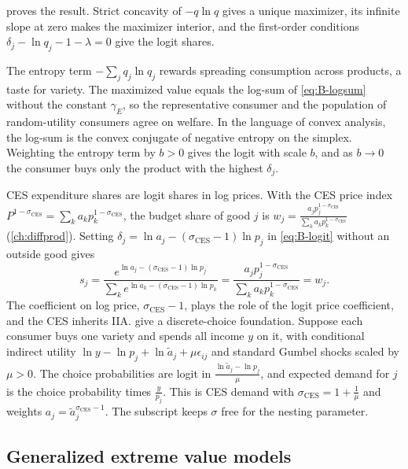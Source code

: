  proves the result. Strict concavity of $-q\ln q$ gives a unique maximizer, its
infinite slope at zero makes the maximizer interior, and the first-order conditions
$\delta_j - \ln q_j - 1 - \lambda = 0$ give the logit shares.

The entropy term $-\sum_jq_j\ln q_j$ rewards spreading consumption across products, a taste for variety. The
maximized value equals the log-sum of \eqref{eq:B-logsum} without the constant $\gamma_E$, so the representative
consumer and the population of random-utility consumers agree on welfare. In the language of convex
analysis, the log-sum is the convex conjugate of negative entropy on the simplex. Weighting the entropy
term by $b > 0$ gives the logit with scale $b$, and as $b \to 0$ the consumer buys only the product with
the highest $\delta_j$.

\begin{remark}\label{rem:B-logit-ces}
CES expenditure shares are logit shares in log prices. With the CES price index
$P^{1 - \sigma_{\mathrm{CES}}} = \sum_ka_kp_k^{1 - \sigma_{\mathrm{CES}}}$, the budget share of good $j$ is
$w_j = \frac{a_jp_j^{1 - \sigma_{\mathrm{CES}}}}{\sum_ka_kp_k^{1 - \sigma_{\mathrm{CES}}}}$ (\cref{ch:diffprod}). Setting
$\delta_j = \ln a_j - (\sigma_{\mathrm{CES}} - 1)\ln p_j$ in \eqref{eq:B-logit} without an outside good gives
\begin{equation*}
s_j = \frac{e^{\ln a_j - (\sigma_{\mathrm{CES}} - 1)\ln p_j}}{\sum_ke^{\ln a_k - (\sigma_{\mathrm{CES}} - 1)\ln p_k}}
= \frac{a_jp_j^{1 - \sigma_{\mathrm{CES}}}}{\sum_ka_kp_k^{1 - \sigma_{\mathrm{CES}}}} = w_j .
\end{equation*}
The coefficient on log price, $\sigma_{\mathrm{CES}} - 1$, plays the role of the logit price coefficient, and the
CES inherits IIA. \citet{AndersonDePalmaThisse1987} give a discrete-choice foundation. Suppose each consumer
buys one variety and spends all income $y$ on it, with conditional indirect utility
$\ln y - \ln p_j + \ln\tilde a_j + \mu\epsilon_{ij}$ and standard Gumbel shocks scaled by $\mu > 0$. The choice
probabilities are logit in $\frac{\ln\tilde a_j - \ln p_j}{\mu}$, and expected demand for $j$ is the choice
probability times $\frac{y}{p_j}$. This is CES demand with $\sigma_{\mathrm{CES}} = 1 + \frac{1}{\mu}$ and weights
$a_j = \tilde a_j^{\sigma_{\mathrm{CES}} - 1}$. The subscript keeps $\sigma$ free for the nesting parameter.
\end{remark}

\subsection{Generalized extreme value models}\label{sec:B-gev}

